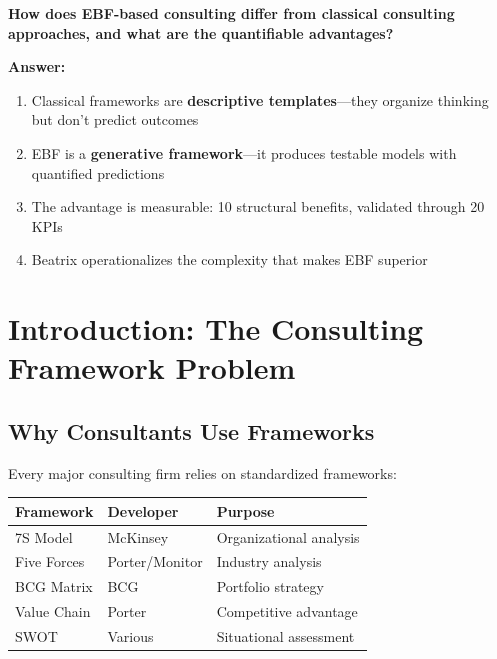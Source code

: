 \begin{tcolorbox}[colback=red!5!white, colframe=red!75!black,
    title=\textbf{Fundamental Question}]

\textbf{How does EBF-based consulting differ from classical consulting approaches,
and what are the quantifiable advantages?}

\vspace{0.5em}
\textbf{Answer:}
\begin{enumerate}[nosep]
    \item Classical frameworks are \textbf{descriptive templates}---they organize thinking but don't predict outcomes
    \item EBF is a \textbf{generative framework}---it produces testable models with quantified predictions
    \item The advantage is measurable: 10 structural benefits, validated through 20 KPIs
    \item Beatrix operationalizes the complexity that makes EBF superior
\end{enumerate}

\end{tcolorbox}



\section{Introduction: The Consulting Framework Problem}
\label{sec:consulting-intro}

\subsection{Why Consultants Use Frameworks}

Every major consulting firm relies on standardized frameworks:

\begin{center}
\renewcommand{\arraystretch}{1.3}
\begin{tabular}{@{}llp{6cm}@{}}
\toprule
\textbf{Framework} & \textbf{Developer} & \textbf{Purpose} \\
\midrule
7S Model & McKinsey & Organizational analysis \\
Five Forces & Porter/Monitor & Industry analysis \\
BCG Matrix & BCG & Portfolio strategy \\
Value Chain & Porter & Competitive advantage \\
SWOT & Various & Situational assessment \\
\bottomrule
\end{tabular}
\end{center}

